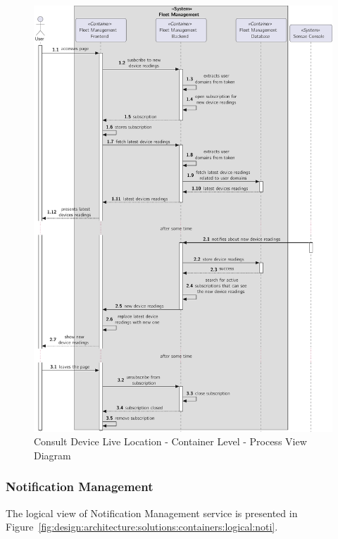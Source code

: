 \begin{figure}[H]
   \centering
   \includegraphics[page=1,width=\columnwidth]{assets/diagrams/design/architectural/level2/process/device-live-location.pdf}
   \caption[Consult Device Live Location - Container Level - Process View Diagram]{Consult Device Live Location - Container Level - Process View Diagram}
   \label{fig:design:architecture:container:process:diagram:fleet}
\end{figure}

\subsubsection{Notification Management}
\label{subsubsec:design:architecture:solutions:notification}

The logical view of Notification Management service is presented in Figure~\ref{fig:design:architecture:solutions:containers:logical:noti}.


